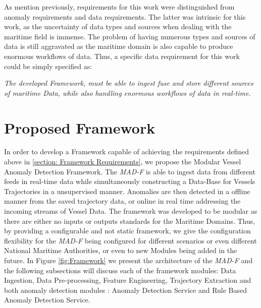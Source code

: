 As mention previously, requirements for this work were distinguished from anomaly requirements and data requirements. The latter was intrinsic for this work, as the uncertainty of data types and sources when dealing with the maritime field is immense. The problem of having numerous types and sources of data is still aggravated as the maritime domain is also capable to produce enormous workflows of data. Thus, a specific data requirement for this work could be simply specified as: 

\emph{The developed Framework, must be able to ingest fuse and store different sources of maritime Data, while also handling enormous workflows of data in real-time.}

\section{Proposed Framework}
In order to develop a Framework capable of achieving the requirements defined above in \ref{section: Framework Requirements}, we propose the Modular Vessel Anomaly Detection Framework. The \emph{MAD-F} is able to ingest data from different feeds in real-time data while simultaneously constructing a Data-Base for Vessels Trajectories in a unsupervised manner. Anomalies are then detected in a offline manner from the saved trajectory data, or online in real time addressing the incoming streams of Vessel Data. 
The framework was developed to be modular as there are either no inputs or outputs standards for the Maritime Domains. Thus, by providing a configurable and not static framework, we give the configuration flexibility for the \emph{MAD-F} being configured for different scenarios or even different National Maritime Authorities, or even to new Modules being added in the future.
In Figure \ref{fig:Framework} we present the architecture of the \emph{MAD-F} and the following subsections will discuss each of the framework modules: Data Ingestion, Data Pre-processing, Feature Engineering, Trajectory Extraction and both anomaly detection modules : Anomaly Detection Service and Rule Based Anomaly Detection Service.

